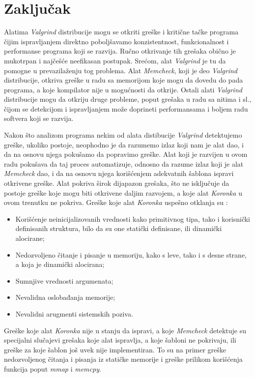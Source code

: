 \documentclass[12pt,oneside]{memoir}
\theoremstyle{plain}
\theoremstyle{definition}
\begin{document}

\chapter{Zaključak}
Alatima \textit{Valgrind} distribucije mogu se otkriti greške i kritične tačke programa čijim ispravljanjem direktno poboljšavamo konzistentnost, funkcionalnost i performanse programa koji se razvija. Ručno otkrivanje tih grešaka obično je mukotrpan i najčešće neefikasan postupak. Srećom, alat \textit{Valgrind} je tu da pomogne u prevazilaženju tog problema. Alat \textit{Memcheck}, koji je deo \textit{Valgrind} distribucije, otkriva greške u radu sa memorijom koje mogu da dovedu do pada programa, a koje kompilator nije u mogućnosti da otkrije. Ostali alati \textit{Valgrind} distribucije mogu da otkriju druge probleme, poput grešaka u radu sa nitima i sl., čijom se detekcijom i ispravljanjem može doprineti performansama i boljem radu softvera koji se razvija. 

Nakon što analizom programa nekim od alata distibucije \textit{Valgrind} detektujemo greške, ukoliko postoje, neophodno je da razumemo izlaz koji nam je alat dao, i da na osnovu njega pokušamo da popravimo greške. Alat koji je razvijen u ovom radu pokušava da taj proces automatizuje, odnosno da razume izlaz koji je alat \textit{Memcheck} dao, i da na osnovu njega korišćenjem adekvatnih šablona ispravi otkrivene greške. Alat pokriva širok dijapazon grešaka, što ne isključuje da postoje greške koje mogu biti otkrivene daljim razvojem, a koje alat \textit{Koronka} u ovom trenutku ne pokriva. Greške koje alat \textit{Koronka} uspešno otklanja su :
\begin{itemize}
\item Korišćenje neinicijalizovanih vrednosti kako primitivnog tipa, tako i korisnički definisanih struktura, bilo da su one statički definisane, ili dinamički alocirane;
\item Nedozvoljeno čitanje i pisanje u memoriju, kako s leve, tako i s desne strane, a koja je dinamički alocirana;
\item Sumnjive vrednosti argumenata;
\item Nevalidna oslobađanja memorije;
\item Nevalidni arugmenti sistemskih poziva.
\end{itemize}
Greške koje alat \textit{Koronka} nije u stanju da ispravi, a koje \textit{Memcheck} detektuje su specijalni slučajevi grešaka koje alat ispravlja, a koje šabloni ne pokrivaju, ili greške za koje šablon još uvek nije implementiran.
To su na primer greške nedozvoljenog čitanja i pisanja iz statičke memorije i greške prilikom korišćenja funkcija poput \textit{mmap} i \textit{memcpy}.
\end{document}
